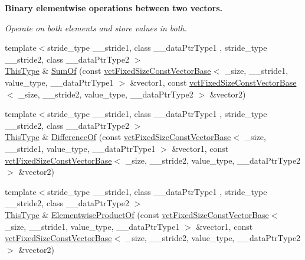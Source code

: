 \begin{Indent}{\bf Binary elementwise operations between two vectors.}\par
{\em Operate on both elements and store values in both. }\begin{DoxyCompactItemize}
\item 
{\footnotesize template$<$stride\-\_\-type \-\_\-\-\_\-stride1, class \-\_\-\-\_\-data\-Ptr\-Type1 , stride\-\_\-type \-\_\-\-\_\-stride2, class \-\_\-\-\_\-data\-Ptr\-Type2 $>$ }\\\hyperlink{classvct_fixed_size_const_vector_base_a071063bc4fa43112cc287b2dbef53180}{This\-Type} \& \hyperlink{classvct_fixed_size_vector_base_af6bd17237d78a517d974eda2646baee3}{Sum\-Of} (const \hyperlink{classvct_fixed_size_const_vector_base}{vct\-Fixed\-Size\-Const\-Vector\-Base}$<$ \-\_\-size, \-\_\-\-\_\-stride1, value\-\_\-type, \-\_\-\-\_\-data\-Ptr\-Type1 $>$ \&vector1, const \hyperlink{classvct_fixed_size_const_vector_base}{vct\-Fixed\-Size\-Const\-Vector\-Base}$<$ \-\_\-size, \-\_\-\-\_\-stride2, value\-\_\-type, \-\_\-\-\_\-data\-Ptr\-Type2 $>$ \&vector2)
\item 
{\footnotesize template$<$stride\-\_\-type \-\_\-\-\_\-stride1, class \-\_\-\-\_\-data\-Ptr\-Type1 , stride\-\_\-type \-\_\-\-\_\-stride2, class \-\_\-\-\_\-data\-Ptr\-Type2 $>$ }\\\hyperlink{classvct_fixed_size_const_vector_base_a071063bc4fa43112cc287b2dbef53180}{This\-Type} \& \hyperlink{classvct_fixed_size_vector_base_a5b4e2b0c1506ba37b12c40a2d98e5290}{Difference\-Of} (const \hyperlink{classvct_fixed_size_const_vector_base}{vct\-Fixed\-Size\-Const\-Vector\-Base}$<$ \-\_\-size, \-\_\-\-\_\-stride1, value\-\_\-type, \-\_\-\-\_\-data\-Ptr\-Type1 $>$ \&vector1, const \hyperlink{classvct_fixed_size_const_vector_base}{vct\-Fixed\-Size\-Const\-Vector\-Base}$<$ \-\_\-size, \-\_\-\-\_\-stride2, value\-\_\-type, \-\_\-\-\_\-data\-Ptr\-Type2 $>$ \&vector2)
\item 
{\footnotesize template$<$stride\-\_\-type \-\_\-\-\_\-stride1, class \-\_\-\-\_\-data\-Ptr\-Type1 , stride\-\_\-type \-\_\-\-\_\-stride2, class \-\_\-\-\_\-data\-Ptr\-Type2 $>$ }\\\hyperlink{classvct_fixed_size_const_vector_base_a071063bc4fa43112cc287b2dbef53180}{This\-Type} \& \hyperlink{classvct_fixed_size_vector_base_a671a77d4cbe2275b2cb0c89496addcb7}{Elementwise\-Product\-Of} (const \hyperlink{classvct_fixed_size_const_vector_base}{vct\-Fixed\-Size\-Const\-Vector\-Base}$<$ \-\_\-size, \-\_\-\-\_\-stride1, value\-\_\-type, \-\_\-\-\_\-data\-Ptr\-Type1 $>$ \&vector1, const \hyperlink{classvct_fixed_size_const_vector_base}{vct\-Fixed\-Size\-Const\-Vector\-Base}$<$ \-\_\-size, \-\_\-\-\_\-stride2, value\-\_\-type, \-\_\-\-\_\-data\-Ptr\-Type2 $>$ \&vector2)

\end{DoxyCompactItemize}
\end{Indent}
